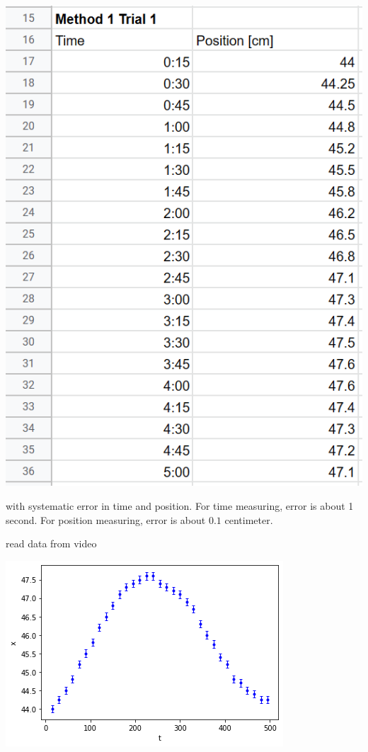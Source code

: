 \documentclass[a4paper]{tufte-handout}
\begin{document}
\includegraphics[scale=0.65]{figures/raw_feb8.png}

with systematic error in time and position. For time measuring, error is about 1 second. For position measuring, error is about $0.1$ centimeter.

\hrulefill

read data from video

\includegraphics[scale=0.65]{figures/data_feb8.png}
\end{document}
